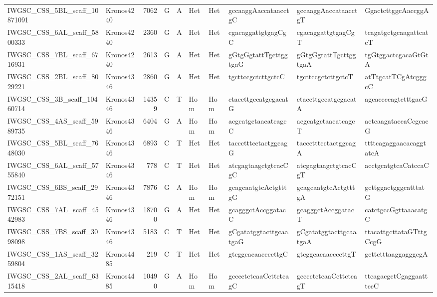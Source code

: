 \begin{tabular}{llrlllllll}
 IWGSC\_CSS\_5BL\_scaff\_10871091 & Kronos4240 &  7062 & G    & A     & Het    & Het   & gccaaggAaccataacctgC     & gccaaggAaccataacctgT     & GgactcttggcAaccggA       \\
 IWGSC\_CSS\_6AL\_scaff\_5800333  & Kronos4240 &  2360 & G    & A     & Het    & Het   & cgacaggattgtgagCgC       & cgacaggattgtgagCgT       & tcagatgctgcaagattcatcT   \\
 IWGSC\_CSS\_7BL\_scaff\_6716931  & Kronos4240 &  2613 & G    & A     & Het    & Het   & gGtgGgtattTgcttggtgaG    & gGtgGgtattTgcttggtgaA    & tgGtggactcgacaGtGtA      \\
 IWGSC\_CSS\_2BL\_scaff\_8029221  & Kronos4346 &  2860 & G    & A     & Het    & Het   & tgcttccgctcttgctcC       & tgcttccgctcttgctcT       & atTtgcatTCgAtcgggcC      \\
 IWGSC\_CSS\_3B\_scaff\_10460714  & Kronos4346 & 14359 & C    & T     & Hom    & Hom   & ctaccttgccatgcgacatG     & ctaccttgccatgcgacatA     & agcaccccagtctttgacG      \\
 IWGSC\_CSS\_4AS\_scaff\_5989735  & Kronos4346 &  6404 & G    & A     & Hom    & Hom   & acgcatgctaacatcagcC      & acgcatgctaacatcagcT      & actcaagataccaCcgcacG     \\
 IWGSC\_CSS\_5BL\_scaff\_7648030  & Kronos4346 &  6893 & C    & T     & Het    & Het   & taccctttcctactggcagG     & taccctttcctactggcagA     & ttttcagaggaacacaggtatcA  \\
 IWGSC\_CSS\_6AL\_scaff\_5755840  & Kronos4346 &   778 & C    & T     & Het    & Het   & atcgagtaagctgtcacCgC     & atcgagtaagctgtcacCgT     & acctgcatgtcaCatccaC      \\
 IWGSC\_CSS\_6BS\_scaff\_2972151  & Kronos4346 &  7876 & G    & A     & Hom    & Hom   & gcagcaatgtcActgtttgG     & gcagcaatgtcActgtttgA     & gcttggactgggcatttatG     \\
 IWGSC\_CSS\_7AL\_scaff\_4542983  & Kronos4346 & 18700 & G    & A     & Het    & Het   & gcagggctAccggatacC       & gcagggctAccggatacT       & catctgccGgttaaacatgC     \\
 IWGSC\_CSS\_7BS\_scaff\_3098098  & Kronos4346 &  5183 & C    & T     & Het    & Het   & gCgatatggtacttgcaatgaG   & gCgatatggtacttgcaatgaA   & ttacattgcttataGTttgCcgG  \\
 IWGSC\_CSS\_1AS\_scaff\_3259804  & Kronos4485 &   219 & C    & T     & Het    & Het   & gtcggcacaaccccttgC       & gtcggcacaaccccttgT       & gcttctttaaggagggcgA      \\
 IWGSC\_CSS\_2AL\_scaff\_6315418  & Kronos4485 & 10490 & G    & A     & Hom    & Hom   & gcccctctcaaCcttctcagC    & gcccctctcaaCcttctcagT    & ttcagacgctCgaggaatttccC  \\

\end{tabular}
